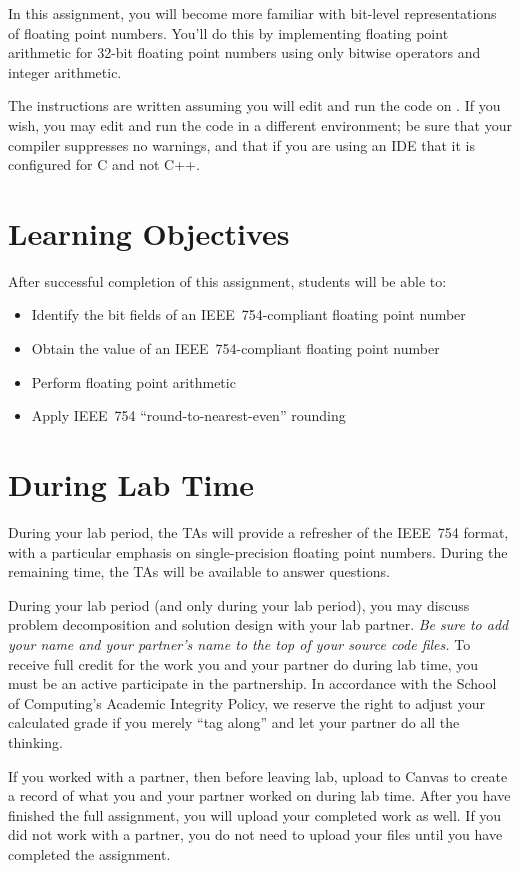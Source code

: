 In this assignment, you will become more familiar with bit-level representations of floating point numbers.
You'll do this by implementing floating point arithmetic for 32-bit floating point numbers using only bitwise operators and integer arithmetic.

The instructions are written assuming you will edit and run the code on \runtimeenvironment.
If you wish, you may edit and run the code in a different environment;
be sure that your compiler suppresses no warnings, and that if you are using an IDE that it is configured for C and not C++.

\tableofcontents

\section*{Learning Objectives}

After successful completion of this assignment, students will be able to:
\begin{itemize}
    \item Identify the bit fields of an IEEE~754-compliant floating point number
    \item Obtain the value of an IEEE~754-compliant floating point number
    \item Perform floating point arithmetic
    \item Apply IEEE~754 ``round-to-nearest-even'' rounding
\end{itemize}

\section*{During Lab Time}

During your lab period, the TAs will provide a refresher of the IEEE~754 format, with a particular emphasis on single-precision floating point numbers.
During the remaining time, the TAs will be available to answer questions.

During your lab period (and only during your lab period), you may discuss problem decomposition and solution design with your lab partner.
\textit{Be sure to add your name and your partner's name to the top of your source code files.}
To receive full credit for the work you and your partner do during lab time, you must be an active participate in the partnership.
In accordance with the School of Computing's Academic Integrity Policy, we reserve the right to adjust your calculated grade if you merely ``tag along'' and let your partner do all the thinking.

If you worked with a partner, then before leaving lab, upload \requiredfiles to Canvas to create a record of what you and your partner worked on during lab time.
After you have finished the full assignment, you will upload your completed work as well.
If you did not work with a partner, you do not need to upload your files until you have completed the assignment.